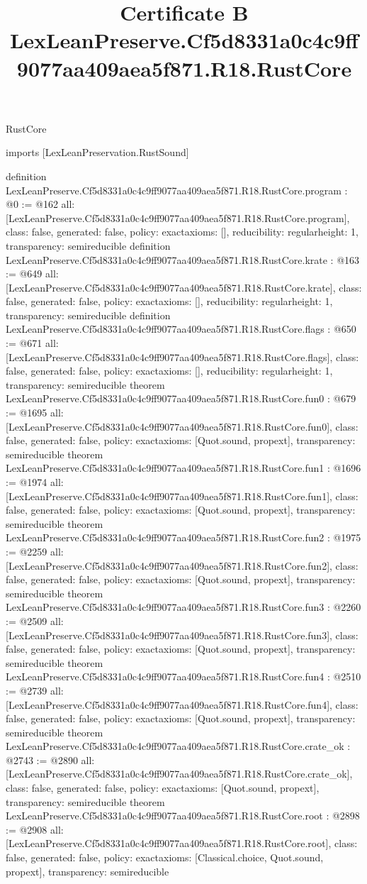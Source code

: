 \begin{lexlean}{RustCore}
\title{Certificate B LexLeanPreserve.Cf5d8331a0c4c9ff9077aa409aea5f871.R18.RustCore}
\begin{coremodule}
imports [LexLeanPreservation.RustSound]

definition LexLeanPreserve.Cf5d8331a0c4c9ff9077aa409aea5f871.R18.RustCore.program : @0 := @162 {
  all: [LexLeanPreserve.Cf5d8331a0c4c9ff9077aa409aea5f871.R18.RustCore.program],
  class: false,
  generated: false,
  policy: exact{axioms: []},
  reducibility: regular{height: 1},
  transparency: semireducible
}
definition LexLeanPreserve.Cf5d8331a0c4c9ff9077aa409aea5f871.R18.RustCore.krate : @163 := @649 {
  all: [LexLeanPreserve.Cf5d8331a0c4c9ff9077aa409aea5f871.R18.RustCore.krate],
  class: false,
  generated: false,
  policy: exact{axioms: []},
  reducibility: regular{height: 1},
  transparency: semireducible
}
definition LexLeanPreserve.Cf5d8331a0c4c9ff9077aa409aea5f871.R18.RustCore.flags : @650 := @671 {
  all: [LexLeanPreserve.Cf5d8331a0c4c9ff9077aa409aea5f871.R18.RustCore.flags],
  class: false,
  generated: false,
  policy: exact{axioms: []},
  reducibility: regular{height: 1},
  transparency: semireducible
}
theorem LexLeanPreserve.Cf5d8331a0c4c9ff9077aa409aea5f871.R18.RustCore.fun0 : @679 := @1695 {
  all: [LexLeanPreserve.Cf5d8331a0c4c9ff9077aa409aea5f871.R18.RustCore.fun0],
  class: false,
  generated: false,
  policy: exact{axioms: [Quot.sound, propext]},
  transparency: semireducible
}
theorem LexLeanPreserve.Cf5d8331a0c4c9ff9077aa409aea5f871.R18.RustCore.fun1 : @1696 := @1974 {
  all: [LexLeanPreserve.Cf5d8331a0c4c9ff9077aa409aea5f871.R18.RustCore.fun1],
  class: false,
  generated: false,
  policy: exact{axioms: [Quot.sound, propext]},
  transparency: semireducible
}
theorem LexLeanPreserve.Cf5d8331a0c4c9ff9077aa409aea5f871.R18.RustCore.fun2 : @1975 := @2259 {
  all: [LexLeanPreserve.Cf5d8331a0c4c9ff9077aa409aea5f871.R18.RustCore.fun2],
  class: false,
  generated: false,
  policy: exact{axioms: [Quot.sound, propext]},
  transparency: semireducible
}
theorem LexLeanPreserve.Cf5d8331a0c4c9ff9077aa409aea5f871.R18.RustCore.fun3 : @2260 := @2509 {
  all: [LexLeanPreserve.Cf5d8331a0c4c9ff9077aa409aea5f871.R18.RustCore.fun3],
  class: false,
  generated: false,
  policy: exact{axioms: [Quot.sound, propext]},
  transparency: semireducible
}
theorem LexLeanPreserve.Cf5d8331a0c4c9ff9077aa409aea5f871.R18.RustCore.fun4 : @2510 := @2739 {
  all: [LexLeanPreserve.Cf5d8331a0c4c9ff9077aa409aea5f871.R18.RustCore.fun4],
  class: false,
  generated: false,
  policy: exact{axioms: [Quot.sound, propext]},
  transparency: semireducible
}
theorem LexLeanPreserve.Cf5d8331a0c4c9ff9077aa409aea5f871.R18.RustCore.crate_ok : @2743 := @2890 {
  all: [LexLeanPreserve.Cf5d8331a0c4c9ff9077aa409aea5f871.R18.RustCore.crate_ok],
  class: false,
  generated: false,
  policy: exact{axioms: [Quot.sound, propext]},
  transparency: semireducible
}
theorem LexLeanPreserve.Cf5d8331a0c4c9ff9077aa409aea5f871.R18.RustCore.root : @2898 := @2908 {
  all: [LexLeanPreserve.Cf5d8331a0c4c9ff9077aa409aea5f871.R18.RustCore.root],
  class: false,
  generated: false,
  policy: exact{axioms: [Classical.choice, Quot.sound, propext]},
  transparency: semireducible
}


\end{coremodule}
\end{lexlean}
